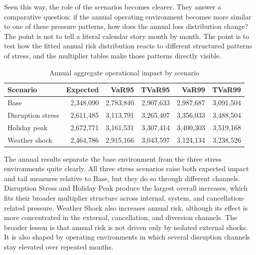 \documentclass[11pt]{article}
\begin{document}
\begin{table}[H]
\centering
\caption{Scenario multipliers in the disrupted state}
\label{tab:disrupted-multipliers-en}
\end{table}

Seen this way, the role of the scenarios becomes clearer. They answer a comparative question: if the annual operating environment becomes more similar to one of these pressure patterns, how does the annual loss distribution change? The point is not to tell a literal calendar story month by month. The point is to test how the fitted annual risk distribution reacts to different structured patterns of stress, and the multiplier tables make those patterns directly visible.

\begin{table}[H]
\centering
\caption{Annual aggregate operational impact by scenario}
\begin{tabular}{lrrrrr}
\toprule
Scenario & Expected & VaR95 & TVaR95 & VaR99 & TVaR99 \\
\midrule
Base & 2,348,090 & 2,783,840 & 2,907,633 & 2,987,687 & 3,091,504 \\
Disruption stress & 2,611,485 & 3,113,791 & 3,265,407 & 3,356,033 & 3,488,504 \\
Holiday peak & 2,672,771 & 3,161,531 & 3,307,414 & 3,400,303 & 3,519,168 \\
Weather shock & 2,464,786 & 2,915,166 & 3,043,597 & 3,124,134 & 3,238,526 \\
\bottomrule
\end{tabular}
\end{table}

The annual results separate the base environment from the three stress environments quite clearly. All three stress scenarios raise both expected impact and tail measures relative to Base, but they do so through different channels. Disruption Stress and Holiday Peak produce the largest overall increases, which fits their broader multiplier structure across internal, system, and cancellation-related pressure. Weather Shock also increases annual risk, although its effect is more concentrated in the external, cancellation, and diversion channels. The broader lesson is that annual risk is not driven only by isolated external shocks. It is also shaped by operating environments in which several disruption channels stay elevated over repeated months.
\end{document}
